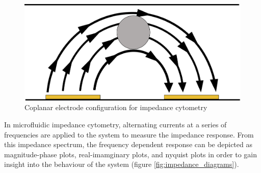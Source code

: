  
 \begin{figure}[ht]
     \centering
     \includegraphics[width=\textwidth]{images/coplanar.png}
     \caption{Coplanar electrode configuration for impedance cytometry}
     \label{fig:coplanar_electrodes}
 \end{figure}
 
 \par In microfluidic impedance cytometry, alternating currents at a series of frequencies are applied to the system to measure the impedance response. From this impedance spectrum, the frequency dependent response can be depicted as magnitude-phase plots, real-imamginary plots, and nyquist plots in order to gain insight into the behaviour of the system (figure \ref{fig:impedance_diagrams}). 
 
